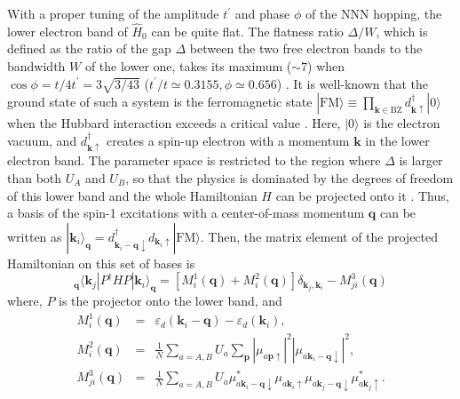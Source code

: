 \documentclass[amsmath,superscriptaddress,showpacs,aps,prl,twocolumn]{revtex4-1}
\begin{document}
\par With a proper tuning of the amplitude $t^\prime$ and phase $\phi$ of the NNN hopping, the lower electron band of $\hat{H}_0$ can be quite flat. The flatness ratio $\Delta/W$, which is defined as the ratio of the gap $\Delta$ between the two free electron bands to the bandwidth $W$ of the lower one, takes its maximum ($\sim7$) when $\cos\phi=t/4t^\prime=3\sqrt{3/43}$ ($t^\prime/t\simeq0.3155, \phi\simeq0.656$) \cite{Neupert_PRL2011}. It is well-known that the ground state of such a system is the ferromagnetic state $|\text{FM}\rangle\equiv\prod_{\mathbf{k}\in\text{BZ}}d^\dagger_{\mathbf{k}\uparrow}|0\rangle$ when the Hubbard interaction exceeds a critical value \cite{Tasaki_PRL1994,Su_PRB2019}. Here, $|0\rangle$ is the electron vacuum, and $d^\dagger_{\mathbf{k}\uparrow}$ creates a spin-up electron with a momentum $\mathbf{k}$ in the lower electron band. The parameter space is restricted to the region where $\Delta$ is larger than both $U_A$ and $U_B$, so that the physics is dominated by the degrees of freedom of this lower band and the whole Hamiltonian $H$ can be projected onto it \cite{Neupert_PRL2011,Regnault_PRX2011,Neupert_PRB2011,Neupert_PRL2012,Su_PRB2019}. Thus, a basis of the spin-1 excitations with a center-of-mass momentum $\mathbf{q}$ can be written as $|\mathbf{k}_i\rangle_\mathbf{q}=d^\dagger_{\mathbf{k}_i-\mathbf{q}\downarrow}d_{\mathbf{k}_i\uparrow}|\text{FM}\rangle$. Then, the matrix element of the projected Hamiltonian on this set of bases is
\begin{equation}\label{PHP}
_\mathbf{q}\langle\mathbf{k}_j|P^\dagger HP|\mathbf{k}_i\rangle_\mathbf{q}=\left[M_{i}^1(\mathbf{q})+M_{i}^2(\mathbf{q})\right]\delta_{\mathbf{k}_j,\mathbf{k}_i}-M_{ji}^3(\mathbf{q})
\end{equation}
where, $P$ is the projector onto the lower band, and
\begin{eqnarray}
M_{i}^1(\mathbf{q}) &=& \varepsilon_d(\mathbf{k}_i-\mathbf{q})-\varepsilon_d(\mathbf{k}_i), \label{M1}\\
M_{i}^2(\mathbf{q}) &=& \frac{1}{N}\sum_{a=A,B}U_a\sum_{\mathbf{p}}\left|\mu_{a\mathbf{p}\uparrow}\right|^2\left|\mu_{a\mathbf{k}_{i}-\mathbf{q}\downarrow}\right|^2, \label{M2}\\
M_{ji}^3(\mathbf{q}) &=& \frac{1}{N}\sum_{a=A,B}U_a
\mu^{\ast}_{a\mathbf{k}_i-\mathbf{q}\downarrow}\mu_{a\mathbf{k}_{i}\uparrow}\mu_{a\mathbf{k}_j-\mathbf{q}\downarrow}\mu^{\ast}_{a\mathbf{k}_{j}\uparrow}. \label{M3}
\end{eqnarray}
\end{document}
